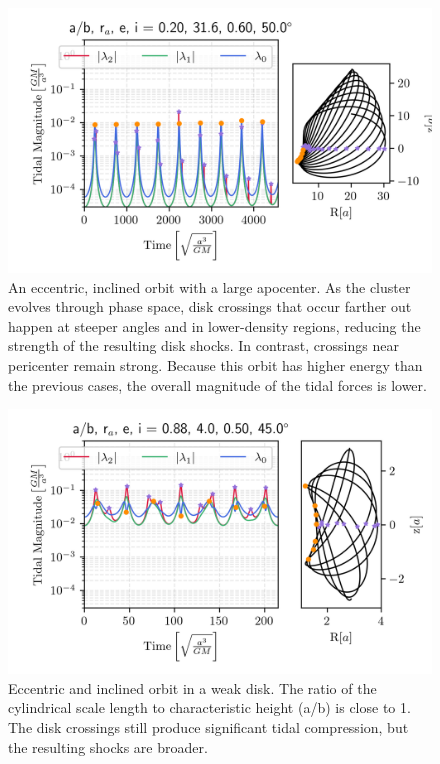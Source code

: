             \begin{figure}
                \centering
                \includegraphics[width=.9\linewidth]{images/miyamoto_disc_shocks_ab_rp_e_i_0.20_31.6_0.60_50.0.png}
                \caption{An eccentric, inclined orbit with a large apocenter. As the cluster evolves through phase space, disk crossings that occur farther out happen at steeper angles and in lower-density regions, reducing the strength of the resulting disk shocks. In contrast, crossings near pericenter remain strong. Because this orbit has higher energy than the previous cases, the overall magnitude of the tidal forces is lower. }
                \label{fig:miyamoto_disc_shocks_big_apocenter}
            \end{figure}
            
            \begin{figure}
                \centering
                \includegraphics[width=.9\linewidth]{images/miyamoto_disc_shocks_ab_rp_e_i_0.88_4.0_0.50_45.0.png}
                \caption{Eccentric and inclined orbit in a weak disk. The ratio of the cylindrical scale length  to characteristic height (a/b) is close to 1. The disk crossings still produce significant tidal compression, but the resulting shocks are broader.}
                \label{fig:miyamoto_disc_shocks_weak_shocks}
            \end{figure}

